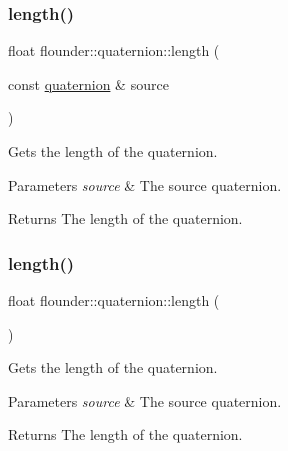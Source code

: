 \subsubsection{\texorpdfstring{length()}{length()}\hspace{0.1cm}{\footnotesize\ttfamily [1/2]}}
{\footnotesize\ttfamily float flounder\+::quaternion\+::length (\begin{DoxyParamCaption}\item[{const \hyperlink{classflounder_1_1quaternion}{quaternion} \&}]{source }\end{DoxyParamCaption})\hspace{0.3cm}{\ttfamily [static]}}



Gets the length of the quaternion. 


\begin{DoxyParams}{Parameters}
{\em source} & The source quaternion. \\
\hline
\end{DoxyParams}
\begin{DoxyReturn}{Returns}
The length of the quaternion. 
\end{DoxyReturn}
\mbox{\label{classflounder_1_1quaternion_afcb607a0604417823b1a37ea842b5ae0}} 
\subsubsection{\texorpdfstring{length()}{length()}\hspace{0.1cm}{\footnotesize\ttfamily [2/2]}}
{\footnotesize\ttfamily float flounder\+::quaternion\+::length (\begin{DoxyParamCaption}{ }\end{DoxyParamCaption})}



Gets the length of the quaternion. 


\begin{DoxyParams}{Parameters}
{\em source} & The source quaternion. \\
\hline
\end{DoxyParams}
\begin{DoxyReturn}{Returns}
The length of the quaternion. 
\end{DoxyReturn}
\mbox{\label{classflounder_1_1quaternion_a5e67f0dc71eeefd2b76788df0157cbd0}} 
